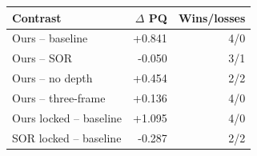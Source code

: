 \begin{tabular}{lrr}
\toprule
Contrast & $\Delta$ PQ & Wins/losses \\
\midrule
Ours -- baseline & +0.841 & 4/0 \\
Ours -- SOR & -0.050 & 3/1 \\
Ours -- no depth & +0.454 & 2/2 \\
Ours -- three-frame & +0.136 & 4/0 \\
Ours locked -- baseline & +1.095 & 4/0 \\
SOR locked -- baseline & -0.287 & 2/2 \\
\bottomrule
\end{tabular}
